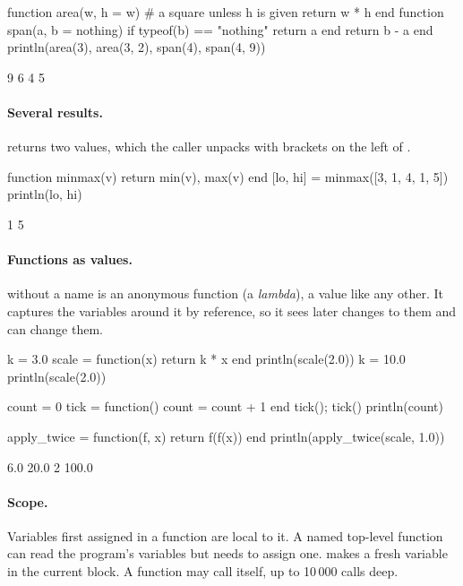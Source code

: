 \documentclass[11pt,a4paper,openany]{report}
\begin{document}
{{\begin{axon}
function area(w, h = w)          # a square unless h is given
  return w * h
end
function span(a, b = nothing)
  if typeof(b) == "nothing"
    return a
  end
  return b - a
end
println(area(3), area(3, 2), span(4), span(4, 9))
\end{axon}
\begin{axonout}
9 6 4 5
\end{axonout}

\paragraph{Several results.}  returns two values, which the
caller unpacks with brackets on the left of \code{=}.

\begin{axon}
function minmax(v)
  return min(v), max(v)
end
[lo, hi] = minmax([3, 1, 4, 1, 5])
println(lo, hi)
\end{axon}
\begin{axonout}
1 5
\end{axonout}

\paragraph{Functions as values.}  without a name is an
anonymous function (a \emph{lambda}), a value like any other. It captures the
variables around it by reference, so it sees later changes to them and can
change them.

\begin{axon}
k = 3.0
scale = function(x) return k * x end
println(scale(2.0))
k = 10.0
println(scale(2.0))

count = 0
tick = function() count = count + 1 end
tick(); tick()
println(count)

apply_twice = function(f, x) return f(f(x)) end
println(apply_twice(scale, 1.0))
\end{axon}
\begin{axonout}
6.0
20.0
2
100.0
\end{axonout}

\paragraph{Scope.} Variables first assigned in a function are local to it. A
named top-level function can read the program's variables but needs
 to assign one.  makes a fresh variable in the
current block. A function may call itself, up to 10\,000 calls deep.

}}
\end{document}
